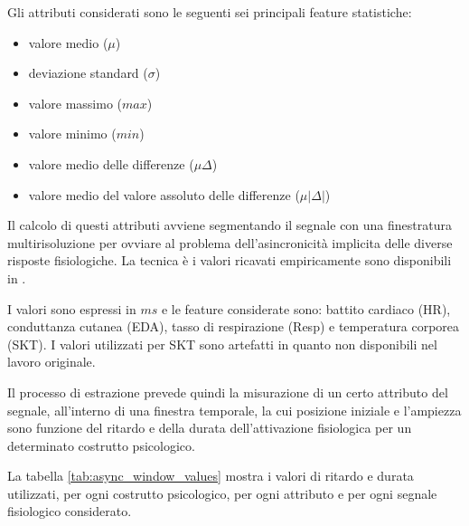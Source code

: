 Gli attributi considerati sono le seguenti sei principali feature statistiche:
\begin{itemize}
  \item valore medio ($\mu$)
  \item deviazione standard ($\sigma$)
  \item valore massimo ($max$)
  \item valore minimo ($min$)
  \item valore medio delle differenze ($\mu\Delta$)
  \item valore medio del valore assoluto delle differenze ($\mu\left|\Delta\right|$)
\end{itemize}

Il calcolo di questi attributi avviene segmentando il segnale con una finestratura multirisoluzione per ovviare al problema dell'asincronicità implicita delle diverse risposte fisiologiche. La tecnica è i valori ricavati empiricamente sono disponibili in \cite{courtemanche2014multiresolution}.

I valori sono espressi in $ms$ e le feature considerate sono: battito cardiaco (HR), conduttanza cutanea (EDA), tasso di respirazione (Resp) e temperatura corporea (SKT). I valori utilizzati per SKT sono artefatti in quanto non disponibili nel lavoro originale.

Il processo di estrazione prevede quindi la misurazione di un certo attributo del segnale, all'interno di una finestra temporale, la cui posizione iniziale e l'ampiezza sono funzione del ritardo e della durata dell'attivazione fisiologica per un determinato costrutto psicologico.

La tabella \ref{tab:async_window_values} mostra i valori di ritardo e durata utilizzati, per ogni costrutto psicologico, per ogni attributo e per ogni segnale fisiologico considerato.

